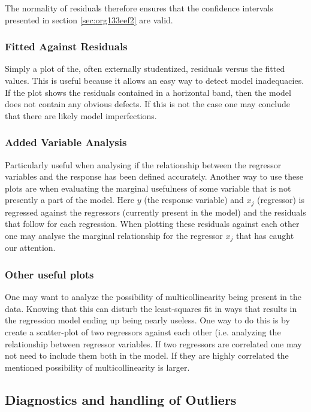 \documentclass[11pt]{article}
\begin{document}
The normality of residuals therefore ensures that the confidence intervals presented in section \ref{sec:org133eef2}
are valid.

\subsubsection{Fitted Against Residuals}
\label{sec:org20353ae}

Simply a plot of the, often externally studentized, residuals versus the fitted values. This is useful
because it allows an easy way to detect model inadequacies. If the plot shows the residuals contained in
a horizontal band, then the model does not contain any obvious defects. If this is not the case one may
conclude that there are likely model imperfections.
\subsubsection{Added Variable Analysis}
\label{sec:org3c6e7c9}

Particularly useful when analysing if the relationship between the regressor variables and the response
has been defined accurately. Another way to use these plots are when evaluating the marginal usefulness
of some variable that is not presently a part of the model. Here \(y\) (the response variable) and \(x_j\)
(regressor) is regressed against the regressors (currently present in the model) and the residuals that
follow for each regression. When plotting these residuals against each other one may analyse the marginal
relationship for the regressor \(x_j\) that has caught our attention.

\subsubsection{Other useful plots}
\label{sec:org5ff7a9e}

One may want to analyze the possibility of multicollinearity being present in the data. Knowing that
this can disturb the least-squares fit in ways that results in the regression model ending up being
nearly useless. One way to do this is by create a scatter-plot of two regressors against each other
(i.e. analyzing the relationship between regressor variables. If two regressors are correlated one 
may not need to include them both in the model. If they are highly correlated the mentioned possibility 
of multicollinearity is larger. 

\subsection{Diagnostics and handling of Outliers}
\label{sec:org9f4e51d}
\end{document}
